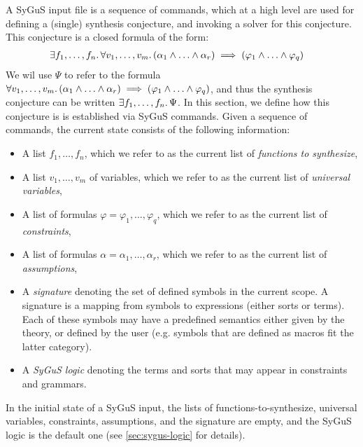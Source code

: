 \documentclass[english,a4paper,10pt]{article}
\begin{document}
A SyGuS input file is a sequence of commands,
which at a high level
are used for defining a (single) synthesis conjecture,
and invoking a solver for this conjecture.
This conjecture is a closed formula of the form:
\begin{alignat*}{1}
 & \exists f_1,\ldots,f_n \ldotp \forall v_1,\ldots,v_m \ldotp (\alpha_1 \wedge \ldots \wedge \alpha_r) \implies (\varphi_1 \wedge \ldots \wedge \varphi_q )
\end{alignat*}
We wil use $\Psi$ to refer to the formula $\forall v_1,\ldots,v_m \ldotp (\alpha_1 \wedge \ldots \wedge \alpha_r)\implies (\varphi_1 \wedge \ldots \wedge \varphi_q )$, and thus the synthesis conjecture can be written $\exists f_1,\ldots,f_n \ldotp \Psi$. 
In this section, we define how this conjecture is
is established via SyGuS commands.
Given a sequence of commands, the current state consists of the following
information:
\begin{itemize}
\item A list
$f_1, \ldots, f_n$, which we refer to
as the current list of \emph{functions to synthesize},
\item A list 
$v_1, \ldots, v_m$ of variables, 
which we refer to as the current list of \emph{universal variables},
\item A list of formulas
$\varphi = \varphi_1, \ldots, \varphi_q$,
which we refer to as the current list of \emph{constraints},
\item A list of formulas
$\alpha = \alpha_1, \ldots, \alpha_r$,
which we refer to as the current list of \emph{assumptions},
\item A \emph{signature}
denoting the set of defined symbols in the current scope.
A signature is 
a mapping from symbols to expressions (either sorts or terms).
Each of these symbols may have a predefined semantics
either given by the theory,
or defined by the user (e.g. symbols that are defined as macros
fit the latter category).
\item A \emph{SyGuS logic} denoting the
terms and sorts that may appear in constraints and grammars.
\end{itemize}
In the initial state of a SyGuS input,
the lists of functions-to-synthesize, 
universal variables, constraints, assumptions, and the signature are empty,
and the SyGuS logic is the default one 
(see \cref{sec:sygus-logic} for details).  
\end{document}
